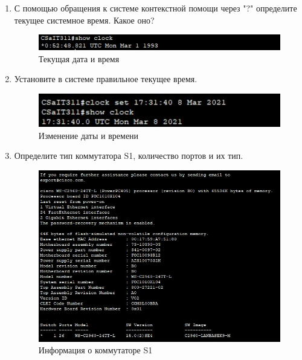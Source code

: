 \documentclass[bachelor, och, labwork]{shiza}
\begin{document}
\begin{enumerate}
    \item С помощью обращения к системе контекстной помощи через "?" определите текущее системное время. 
    Какое оно?

    \begin{figure}[H]
        \centering      %
        \includegraphics[width=1\textwidth]{11}
        \caption{Текущая дата и время}
        \label{fig:image1}
    \end{figure}

    \item Установите в системе правильное текущее время.
    
    \begin{figure}[H]
        \centering      %
        \includegraphics[width=1\textwidth]{12}
        \caption{Изменение даты и времени}
        \label{fig:image1}
    \end{figure}

    \item Определите тип коммутатора S1, количество портов и их тип.
    
    \begin{figure}[H]
        \centering      %
        \includegraphics[width=1\textwidth]{13}
        \caption{Информация о коммутаторе S1}
        \label{fig:image1}
    \end{figure}

\end{enumerate}
\end{document}
